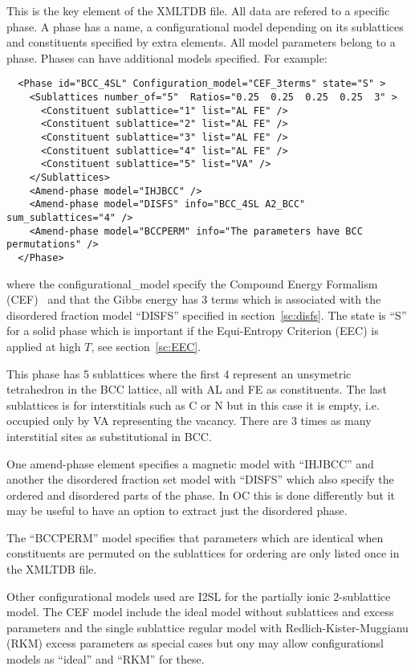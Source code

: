 \documentclass[12pt]{article}
\begin{document}
\begin{appendices}
This is the key element of the XMLTDB file.  All data are refered to a
specific phase.  A phase has a name, a configurational model depending
on its sublattices and constituents specified by extra elements.  All
model parameters belong to a phase. Phases can have additional models
specified.  For example:
\begin{verbatim}
  <Phase id="BCC_4SL" Configuration_model="CEF_3terms" state="S" >
    <Sublattices number_of="5"  Ratios="0.25  0.25  0.25  0.25  3" >
      <Constituent sublattice="1" list="AL FE" />
      <Constituent sublattice="2" list="AL FE" />
      <Constituent sublattice="3" list="AL FE" />
      <Constituent sublattice="4" list="AL FE" />
      <Constituent sublattice="5" list="VA" />
    </Sublattices>
    <Amend-phase model="IHJBCC" />
    <Amend-phase model="DISFS" info="BCC_4SL A2_BCC" sum_sublattices="4" />
    <Amend-phase model="BCCPERM" info="The parameters have BCC permutations" />
  </Phase>
\end{verbatim}
where the configurational\_model specify the Compound Energy Formalism
(CEF)~\cite{CEF} and that the Gibbs energy has 3 terms which is
associated with the disordered fraction model ``DISFS'' specified in
section~\ref{sc:disfs}.  The state is ``S'' for a solid phase which is
important if the Equi-Entropy Criterion (EEC) is applied at high $T$,
see section~\ref{sc:EEC}.

This phase has 5 sublattices where the first 4 represent an unsymetric
tetrahedron in the BCC lattice, all with AL and FE as constituents.
The last sublattices is for interstitials such as C or N but in this
case it is empty, i.e.  occupied only by VA representing the vacancy.
There are 3 times as many interstitial sites as substitutional in BCC.

One amend-phase element specifies a magnetic model with ``IHJBCC'' and
another the disordered fraction set model with ``DISFS'' which also
specify the ordered and disordered parts of the phase.  In OC this
is done differently but it may be useful to have an option to
extract just the disordered phase.

The ``BCCPERM'' model specifies that parameters which are identical
when constituents are permuted on the sublattices for ordering are
only listed once in the XMLTDB file.

Other configurational models used are I2SL for the partially ionic
2-sublattice model.  The CEF model include the ideal model without
sublattices and excess parameters and the single sublattice regular
model with Redlich-Kister-Muggianu (RKM) excess parameters as special
cases but ony may allow configurationsl models as ``ideal'' and
``RKM'' for these.


\end{appendices}
\end{document}

